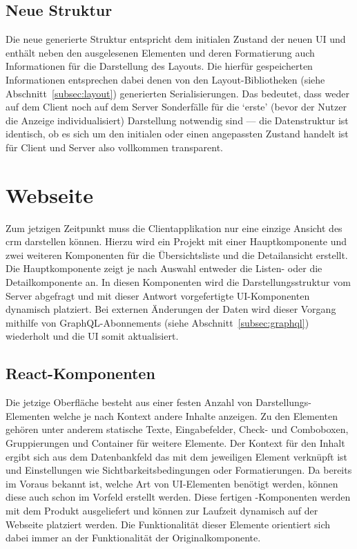 

\subsection{Neue Struktur}
Die neue generierte Struktur entspricht dem initialen Zustand der neuen UI und enthält neben den ausgelesenen Elementen und deren Formatierung auch Informationen für die Darstellung des Layouts. Die hierfür gespeicherten Informationen entsprechen dabei denen von den Layout-Bibliotheken (siehe Abschnitt~\ref{subsec:layout}) generierten Serialisierungen. Das bedeutet, dass weder auf dem Client noch auf dem Server Sonderfälle für die `erste' (bevor der Nutzer die Anzeige individualisiert) Darstellung notwendig sind --- die Datenstruktur ist identisch, ob es sich um den initialen oder einen angepassten Zustand handelt ist für Client und Server also vollkommen transparent.

\section{Webseite}
Zum jetzigen Zeitpunkt muss die Clientapplikation nur eine einzige Ansicht des \gls{crm} darstellen können. Hierzu wird ein Projekt mit einer Hauptkomponente und zwei weiteren Komponenten für die Übersichtsliste und die Detailansicht erstellt. Die Hauptkomponente zeigt je nach Auswahl entweder die Listen- oder die Detailkomponente an. In diesen Komponenten wird die Darstellungsstruktur vom Server abgefragt und mit dieser Antwort vorgefertigte UI-Komponenten dynamisch platziert. Bei externen Änderungen der Daten wird dieser Vorgang mithilfe von GraphQL-Abonnements (siehe Abschnitt~\ref{subsec:graphql}) wiederholt und die UI somit aktualisiert.

\subsection{React-Komponenten}
Die jetzige Oberfläche besteht aus einer festen Anzahl von Darstellungs-Elementen welche je nach Kontext andere Inhalte anzeigen. Zu den Elementen gehören unter anderem statische Texte, Eingabefelder, Check- und Comboboxen, Gruppierungen und Container für weitere Elemente. Der Kontext für den Inhalt ergibt sich aus dem Datenbankfeld das mit dem jeweiligen Element verknüpft ist und Einstellungen wie Sichtbarkeitsbedingungen oder Formatierungen. Da bereits im Voraus bekannt ist, welche Art von UI-Elementen benötigt werden, können diese auch schon im Vorfeld erstellt werden. Diese fertigen -Komponenten werden mit dem Produkt ausgeliefert und können zur Laufzeit dynamisch auf der Webseite platziert werden. Die Funktionalität dieser Elemente orientiert sich dabei immer an der Funktionalität der Originalkomponente.


